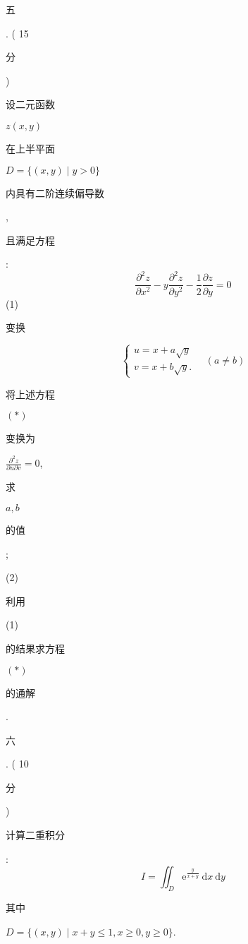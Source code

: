 \documentclass[10pt]{article}
\begin{document}
\begin{CJK}{UTF8}{mj}五\end{CJK}. ( 15 \begin{CJK}{UTF8}{mj}分\end{CJK}) \begin{CJK}{UTF8}{mj}设二元函数\end{CJK} $z(x, y)$ \begin{CJK}{UTF8}{mj}在上半平面\end{CJK} $D=\{(x, y) \mid y>0\}$ \begin{CJK}{UTF8}{mj}内具有二阶连续偏导数\end{CJK}, \begin{CJK}{UTF8}{mj}且满足方程\end{CJK}:
$$
\frac{\partial^{2} z}{\partial x^{2}}-y \frac{\partial^{2} z}{\partial y^{2}}-\frac{1}{2} \frac{\partial z}{\partial y}=0
$$
(1) \begin{CJK}{UTF8}{mj}变换\end{CJK}
$$
\left\{\begin{array}{l}
u=x+a \sqrt{y} \\
v=x+b \sqrt{y} .
\end{array} \quad(a \neq b)\right.
$$
\begin{CJK}{UTF8}{mj}将上述方程\end{CJK} $(*)$ \begin{CJK}{UTF8}{mj}变换为\end{CJK} $\frac{\partial^{2} z}{\partial u \partial v}=0$, \begin{CJK}{UTF8}{mj}求\end{CJK} $a, b$ \begin{CJK}{UTF8}{mj}的值\end{CJK};

(2) \begin{CJK}{UTF8}{mj}利用\end{CJK} (1) \begin{CJK}{UTF8}{mj}的结果求方程\end{CJK} $(*)$ \begin{CJK}{UTF8}{mj}的通解\end{CJK}.

\begin{CJK}{UTF8}{mj}六\end{CJK}. ( 10 \begin{CJK}{UTF8}{mj}分\end{CJK}) \begin{CJK}{UTF8}{mj}计算二重积分\end{CJK}:
$$
I=\iint_{D} \mathrm{e}^{\frac{y}{x+y}} \mathrm{~d} x \mathrm{~d} y
$$
\begin{CJK}{UTF8}{mj}其中\end{CJK} $D=\{(x, y) \mid x+y \leqslant 1, x \geqslant 0, y \geqslant 0\}$.
\end{document}
